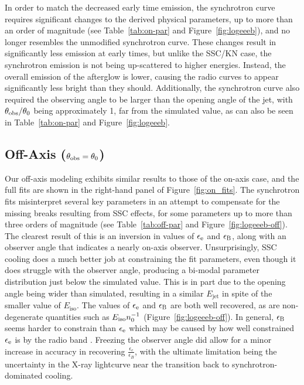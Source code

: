 \documentclass[fleqn,usenatbib]{mnras}
\begin{document}
In order to match the decreased early time emission, the synchrotron curve requires significant changes to the derived physical parameters, up to more than an order of magnitude (see Table~\ref{tab:on-par} and  Figure~\ref{fig:logeeeb}), and no longer resembles the unmodified synchrotron curve. These changes result in significantly less emission at early times, but unlike the SSC/KN case, the synchrotron emission is not being up-scattered to higher energies. Instead, the overall emission of the afterglow is lower, causing the radio curves to appear significantly less bright than they should. Additionally, the synchrotron curve also required the observing angle to be larger than the opening angle of the jet, with $\theta_{\rm obs}/\theta_{0}$ being approximately 1, far from the simulated value, as can also be seen in Table~\ref{tab:on-par} and  Figure~\ref{fig:logeeeb}.


\subsection{Off-Axis ($\theta_{\rm obs}=\theta_0$)}

Our off-axis modeling exhibits similar results to those of the on-axis case, and the full fits are shown in the right-hand panel of Figure~\ref{fig:on_fits}. The synchrotron fits misinterpret several key parameters in an attempt to compensate for the missing breaks resulting from SSC effects, for some parameters up to more than three orders of magnitude (see Table~\ref{tab:off-par} and  Figure~\ref{fig:logeeeb-off}). The clearest result of this is an inversion in values of $\epsilon_{\rm e}$ and $\epsilon_{\rm B}$, along with an observer angle that indicates a nearly on-axis observer. Unsurprisingly, SSC cooling does a much better job at constraining the fit parameters, even though it does struggle with the observer angle, producing a bi-modal parameter distribution just below the simulated value. This is in part due to the opening angle being wider than simulated, resulting in a similar $E_{\text{jet}}$ in spite of the smaller value of $E_{\text{iso}}$. The values of  $\epsilon_{\rm e}$ and $\epsilon_{\rm B}$ are both well recovered, as are non-degenerate quantities such as $E_{\rm iso}n_0^{-1}$ (Figure~\ref{fig:logeeeb-off}). In general, $\epsilon_{\rm B}$ seems harder to constrain than $\epsilon_{\rm e}$ which may be caused by how well constrained $\epsilon_{\rm e}$ is by the radio band \citep{VB1}. Freezing the observer angle did allow for a minor increase in accuracy in recovering $\frac{\epsilon_{e}}{\epsilon_B}$, with the ultimate limitation being the uncertainty in the X-ray lightcurve near the transition back to synchrotron-dominated cooling.
\end{document}
